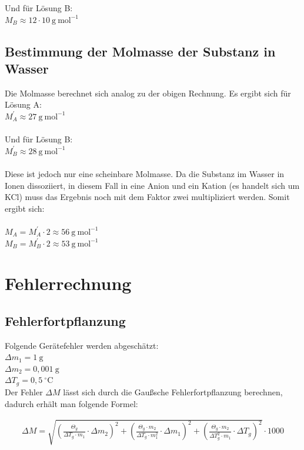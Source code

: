 \documentclass[12pt,a4paper,titlepage,headinclude,bibtotoc]{scrartcl}
\begin{document}
Und für Lösung B:\\

$M_B \approx 12 \cdot 10{~} \mathrm{g{~}mol^{-1}}$


\subsection{Bestimmung der Molmasse der Substanz in Wasser}

Die Molmasse berechnet sich analog zu der obigen Rechnung. Es ergibt sich für Lösung A:\\
$M_A^{'} \approx 27{~} \mathrm{g{~}mol^{-1}}$\\\\
Und für Lösung B:\\
$M_B^{'} \approx 28{~} \mathrm{g{~}mol^{-1}}$\\\\

Diese ist jedoch nur eine scheinbare Molmasse. Da die Substanz im Wasser in Ionen dissoziiert, in diesem Fall in eine Anion und ein Kation (es handelt sich um KCl) muss das Ergebnis noch mit dem Faktor zwei multipliziert werden. Somit ergibt sich:\\\\
$M_A = M_A^{'} \cdot 2 \approx 56{~} \mathrm{g{~}mol^{-1}} $\\
$M_B = M_B^{'} \cdot 2 \approx 53{~} \mathrm{g{~}mol^{-1}} $\\

\section{Fehlerrechnung}
\subsection{Fehlerfortpflanzung}
Folgende Gerätefehler werden abgeschätzt:\\

$\Delta m_1 = 1{~}\mathrm{g}  $\\
$\Delta m_2 = 0,001{~}\mathrm{g}  $\\
$\Delta T_g = 0,5{~}^{\circ} \text{C}  $\\

Der Fehler $\Delta M$ lässt sich durch die Gaußsche Fehlerfortpflanzung berechnen, dadurch erhält man folgende Formel:

\begin{align}
\Delta M = \sqrt{ \left( \frac {\Theta _g}{ \Delta T_g\cdot m_1} \cdot \Delta m_2 \right)^2 + \left( \frac {\Theta _g \cdot m_2 }{ \Delta T_g\cdot m_1^2 } \cdot \Delta m_1 \right)^2 + \left( \frac {\Theta _g \cdot m_2 }{ \Delta T_g^2 \cdot m_1} \cdot \Delta T_g \right)^2 } \cdot 1000
\end{align}
\end{document}
